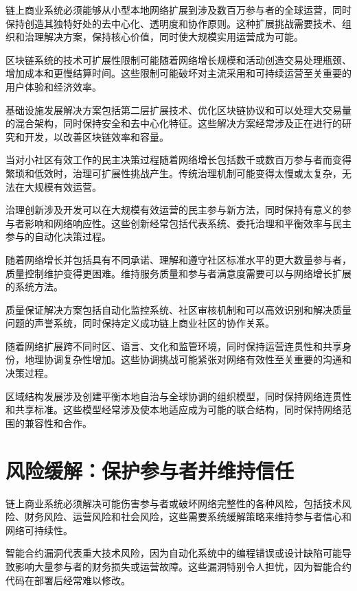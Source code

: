 \documentclass[
  Letterpaper,
]{scrbook}
\begin{document}
链上商业系统必须能够从小型本地网络扩展到涉及数百万参与者的全球运营，同时保持创造其独特好处的去中心化、透明度和协作原则。这种扩展挑战需要技术、组织和治理解决方案，保持核心价值，同时使大规模实用运营成为可能。

区块链系统的技术可扩展性限制可能随着网络增长规模和活动创造交易处理瓶颈、增加成本和更慢结算时间。这些限制可能破坏对主流采用和可持续运营至关重要的用户体验和经济效率。

基础设施发展解决方案包括第二层扩展技术、优化区块链协议和可以处理大交易量的混合架构，同时保持安全和去中心化特征。这些解决方案经常涉及正在进行的研究和开发，以改善区块链效率和容量。

当对小社区有效工作的民主决策过程随着网络增长包括数千或数百万参与者而变得繁琐和低效时，治理可扩展性挑战产生。传统治理机制可能变得太慢或太复杂，无法在大规模有效运营。

治理创新涉及开发可以在大规模有效运营的民主参与新方法，同时保持有意义的参与者影响和网络响应性。这些创新经常包括代表系统、委托治理和平衡效率与民主参与的自动化决策过程。

随着网络增长并包括具有不同承诺、理解和遵守社区标准水平的更大数量参与者，质量控制维护变得更困难。维持服务质量和参与者满意度需要可以与网络增长扩展的系统方法。

质量保证解决方案包括自动化监控系统、社区审核机制和可以高效识别和解决质量问题的声誉系统，同时保持定义成功链上商业社区的协作关系。

随着网络扩展跨不同时区、语言、文化和监管环境，同时保持运营连贯性和共享身份，地理协调复杂性增加。这些协调挑战可能紧张对网络有效性至关重要的沟通和决策过程。

区域结构发展涉及创建平衡本地自治与全球协调的组织模型，同时保持网络连贯性和共享标准。这些模型经常涉及使本地适应成为可能的联合结构，同时保持网络范围的兼容性和合作。

\section{风险缓解：保护参与者并维持信任}\label{ux98ceux9669ux7f13ux89e3ux4fddux62a4ux53c2ux4e0eux8005ux5e76ux7ef4ux6301ux4fe1ux4efb}

链上商业系统必须解决可能伤害参与者或破坏网络完整性的各种风险，包括技术风险、财务风险、运营风险和社会风险，这些需要系统缓解策略来维持参与者信心和网络可持续性。

智能合约漏洞代表重大技术风险，因为自动化系统中的编程错误或设计缺陷可能导致影响大量参与者的财务损失或运营故障。这些漏洞特别令人担忧，因为智能合约代码在部署后经常难以修改。
\end{document}

